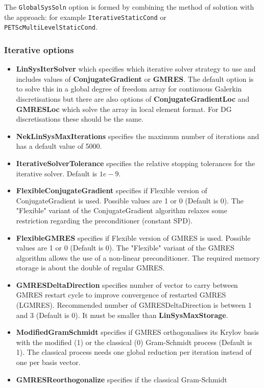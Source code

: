 The \texttt{GlobalSysSoln} option is formed by combining the method of solution
with the approach: for example \texttt{IterativeStaticCond} or
\texttt{PETScMultiLevelStaticCond}.

\subsubsection{Iterative  options}
\begin{itemize}
\item \textbf{LinSysIterSolver} which specifies which iterative solver
  strategy to use and includes values of \textbf{ConjugateGradient} or
  \textbf{GMRES}. The default option is to solve this in a global
  degree of freedom array for continuous Galerkin discretisations but
  there are also options of \textbf{ConjugateGradientLoc} and
  \textbf{GMRESLoc} which solve the array in local element format. For
  DG discretisations these should be the same.
\item \textbf{NekLinSysMaxIterations} specifies the maximum number of
  iterations and has a default value of 5000.
\item \textbf{IterativeSolverTolerance} specifies the relative
  stopping tolerances for the iterative solver. Default is $1e-9$.
\item \textbf{FlexibleConjugateGradient} specifies if Flexible version of 
  ConjugateGradient is used. Possible values are 1 or 0 (Default is 0). 
  The "Flexible" variant of the ConjugateGradient algorithm relaxes some 
  restriction regarding the preconditioner (constant SPD).
\item \textbf{FlexibleGMRES} specifies if Flexible version of GMRES is used. 
  Possible values are 1 or 0 (Default is 0). The "Flexible" variant of the 
  GMRES algorithm allows the use of a non-linear preconditioner. The required
  memory storage is about the double of regular GMRES.
\item \textbf{GMRESDeltaDirection} specifies number of vector to carry between
  GMRES restart cycle to improve convergence of restarted GMRES (LGMRES). Recommended
  number of GMRESDeltaDirection is between 1 and 3 (Default is 0). It must be
  smaller than \textbf{LinSysMaxStorage}.
\item \textbf{ModifiedGramSchmidt} specifies if GMRES orthogonalises its
  Krylov basis with the modified (1) or the classical (0) Gram-Schmidt
  process (Default is 1). The classical process needs one global reduction
  per iteration instead of one per basis vector.
\item \textbf{GMRESReorthogonalize} specifies if the classical Gram-Schmidt

\end{itemize}
